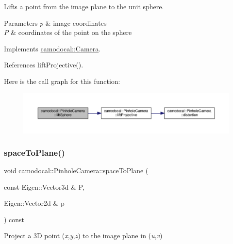 Lifts a point from the image plane to the unit sphere. 


\begin{DoxyParams}{Parameters}
{\em p} & image coordinates \\
\hline
{\em P} & coordinates of the point on the sphere \\
\hline
\end{DoxyParams}


Implements \hyperlink{classcamodocal_1_1Camera_a77b4ea673c694741302efba6f86a0100}{camodocal\+::\+Camera}.



References lift\+Projective().

Here is the call graph for this function\+:\nopagebreak
\begin{figure}[H]
\begin{center}
\leavevmode
\includegraphics[width=350pt]{classcamodocal_1_1PinholeCamera_a0a4191ba420ee40355d8eb0f5cf587a7_cgraph}
\end{center}
\end{figure}
\mbox{\label{classcamodocal_1_1PinholeCamera_a27e7b78d07e19f11d1ca0d3dc2c48b73}} 
\subsubsection{\texorpdfstring{space\+To\+Plane()}{spaceToPlane()}}
{\footnotesize\ttfamily void camodocal\+::\+Pinhole\+Camera\+::space\+To\+Plane (\begin{DoxyParamCaption}\item[{const Eigen\+::\+Vector3d \&}]{P,  }\item[{Eigen\+::\+Vector2d \&}]{p }\end{DoxyParamCaption}) const\hspace{0.3cm}{\ttfamily [virtual]}}



Project a 3D point ({\itshape x},{\itshape y},{\itshape z}) to the image plane in ({\itshape u},{\itshape v}) 


